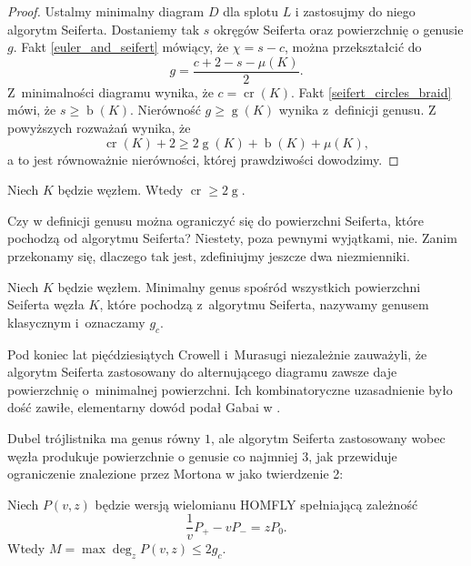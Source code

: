 \begin{proof}
    Ustalmy minimalny diagram $D$ dla splotu $L$ i zastosujmy do niego algorytm Seiferta.
    Dostaniemy tak $s$ okręgów Seiferta oraz powierzchnię o genusie $g$.
    Fakt \ref{euler_and_seifert} mówiący, że $\chi = s - c$, można przekształcić do
    \begin{equation}
        g = \frac{c + 2 - s - \mu(K)}{2}.
    \end{equation}
    Z~minimalności diagramu wynika, że $c = \operatorname{cr}(K)$.
    Fakt \ref{seifert_circles_braid} mówi, że $s \ge \operatorname{b}(K)$.
    Nierówność $g \ge \operatorname{g}(K)$ wynika z~definicji genusu.
    Z powyższych rozważań wynika, że
    \begin{equation}
        \operatorname{cr} (K) + 2 \ge  2 \operatorname{g}(K) + \operatorname{b} (K) + \mu(K),
    \end{equation}
    a to jest równoważnie nierówności, której prawdziwości dowodzimy.
\end{proof}

\begin{corollary}
    \label{crl:crossing_genus}
    Niech $K$ będzie węzłem.
    Wtedy $\operatorname{cr} \ge 2 \operatorname{g}$.
\end{corollary}

Czy w definicji genusu można ograniczyć się do powierzchni Seiferta, które pochodzą od algorytmu Seiferta?
Niestety, poza pewnymi wyjątkami, nie.
Zanim przekonamy się, dlaczego tak jest, zdefiniujmy jeszcze dwa niezmienniki.

\begin{definition}
    Niech $K$ będzie węzłem.
    Minimalny genus spośród wszystkich powierzchni Seiferta węzła $K$, które pochodzą z~algorytmu Seiferta, nazywamy genusem klasycznym i~oznaczamy $g_c$.
\end{definition}

Pod koniec lat pięćdziesiątych Crowell i~Murasugi niezależnie zauważyli, że algorytm Seiferta zastosowany do alternującego diagramu zawsze daje powierzchnię o~minimalnej powierzchni.
Ich kombinatoryczne uzasadnienie było dość zawiłe, elementarny dowód podał Gabai w \cite{gabai86}.

Dubel trójlistnika ma genus równy $1$, ale algorytm Seiferta zastosowany wobec węzła produkuje powierzchnie o genusie co najmniej $3$, jak przewiduje ograniczenie znalezione przez Mortona w \cite{morton86} jako twierdzenie 2:

\begin{proposition}
    Niech $P(v, z)$ będzie wersją wielomianu HOMFLY spełniającą zależność
    \begin{equation}
        \frac 1v P_+ - vP_- = zP_0.
    \end{equation}
    Wtedy $M = \max \deg_z P(v, z) \le 2g_c$.
\end{proposition}

